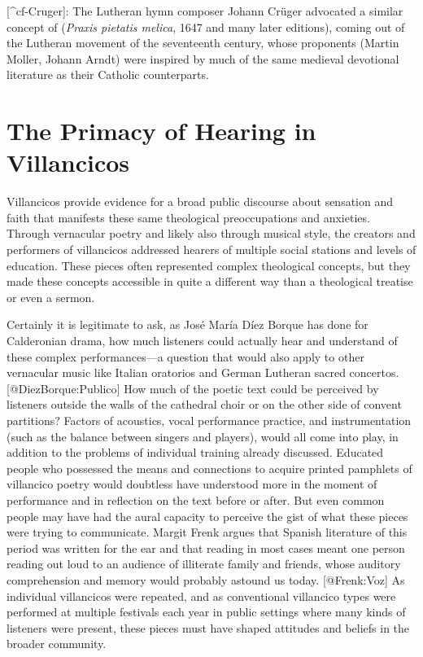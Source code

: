 [^cf-Cruger]:  The Lutheran hymn composer Johann Crüger advocated a similar concept of  (\emph{Praxis pietatis melica}, 1647 and many later editions), coming out of the Lutheran  movement of the seventeenth century, whose proponents (Martin Moller, Johann Arndt) were inspired by much of the same medieval devotional literature as their Catholic counterparts.


\section{The Primacy of Hearing in Villancicos}


Villancicos provide evidence for a broad public discourse about sensation and faith that manifests these same theological preoccupations and anxieties.
Through vernacular poetry and likely also through musical style, the creators and performers of villancicos addressed hearers of multiple social stations and levels of education.
These pieces often represented complex theological concepts, but they made these concepts accessible in quite a different way than a theological treatise or even a sermon.

Certainly it is legitimate to ask, as José María Díez Borque has done for Calderonian drama, how much listeners could actually hear and understand of these complex performances---a question that would also apply to other  vernacular music like Italian oratorios and German Lutheran sacred concertos.
[@DiezBorque:Publico]
How much of the poetic text could be perceived by listeners outside the walls of the cathedral choir or on the other side of convent partitions? Factors of acoustics, vocal performance practice, and instrumentation (such as the balance between singers and players), would all come into play, in addition to the problems of individual training already discussed.
Educated people who possessed the means and connections to acquire printed pamphlets of villancico poetry would doubtless have understood more in the moment of performance and in reflection on the text before or after.
But even common people may have had the aural capacity to perceive the gist of what these pieces were trying to communicate.
Margit Frenk argues that Spanish literature of this period was written for the ear and that reading in most cases meant one person reading out loud to an audience of illiterate family and friends, whose auditory comprehension and memory would probably astound us today.
[@Frenk:Voz]  As individual villancicos were repeated, and as conventional villancico types were performed at multiple festivals each year in public settings where many kinds of listeners were present, these pieces must have shaped attitudes and beliefs in the broader community.


